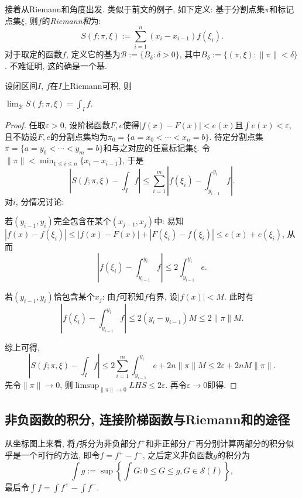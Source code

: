 接着从Riemann和角度出发. 类似于前文的例子, 如下定义: 基于分割点集$\pi$和标记点集$\xi$, 则$f$的\textit{Riemann和}为: $$S(f;\pi ,\xi) := \sum_{i=1}^{n} (x_i-x_{i-1})f(\xi _i) .$$
对于取定的函数$f$, 定义它的基为$\mathcal{B} := \{ B_{\delta}:\delta >0 \}$, 其中$B_{\delta} := \{ (\pi ,\xi) : \| \pi \|< \delta \}$. 不难证明, 这的确是一个基. 

\begin{proposition}{}
	设闭区间$I$, $f$在$I$上Riemann可积, 则
	\begin{center}
		$\displaystyle \lim_{\mathcal{B}} S(f;\pi ,\xi) = \int_I f.$
	\end{center}
\end{proposition}
\begin{proof}
	任取$\varepsilon >0$, 设阶梯函数$F,e$使得$|f(x)-F(x)|<e(x)$且$\int e(x) < \varepsilon$, 且不妨设$F,e$的分割点集均为$\pi _0 =\{ a=x_0<\cdots <x_n=b \}$. 待定分割点集$\pi = \{ a=y_0<\cdots <y_m=b \}$和与之对应的任意标记集$\xi$. 令$\| \pi \| < \min_{1 \leq i \leq n} \{ x_i-x_{i-1} \}$, 于是$$\left| S(f;\pi ,\xi) - \int_I f \right| \leq \sum_{i=1}^{m} \left| f(\xi _i)-\int_{y_{i-1}}^{y_i} f \right|. $$
	对$i$, 分情况讨论: 
	
	若$(y_{i-1},y_i)$完全包含在某个$(x_{j-1},x_j)$中: 易知$|f(x)-f(\xi _i)| \leq |f(x)-F(x)| + |F(\xi _i)-f(\xi _i)| \leq e(x)+e(\xi _i)$, 
	从而$$\left| f(\xi _i)-\int_{y_{i-1}}^{y_i} f \right| \leq 2\int_{y_{i-1}}^{y_i} e.$$
	
	若$(y_{i-1},y_i)$恰包含某个$x_j$: 由$f$可积知$f$有界, 设$|f(x)|<M$. 此时有$$\left| f(\xi _i)-\int_{y_{i-1}}^{y_i} f \right| \leq 2(y_i-y_{i-1})M \leq 2\| \pi \|M.$$
	
	综上可得, $$\left| S(f;\pi ,\xi) - \int_I f \right| \leq 2\sum_{i=1}^{m} \int_{y_{i-1}}^{y_i} e + 2n\| \pi \|M \leq 2\varepsilon + 2nM\| \pi \|.$$
	先令$\| \pi \|\to 0$, 则$\limsup_{\| \pi \|\to 0} LHS \leq 2\varepsilon$. 再令$\varepsilon \to 0$即得. 
\end{proof}


\subsection{非负函数的积分, 连接阶梯函数与Riemann和的途径}

从坐标图上来看, 将$f$拆分为非负部分$f^+$和非正部分$f^-$再分别计算两部分的积分似乎是一个可行的方法, 即令$f=f^+-f^-$, 之后定义非负函数$g$的积分为$$\int g := \sup \left\{ \int G:0\leq G \leq g, G \in \mathcal{S}(I)  \right\}, $$
最后令$\int f = \int f^+ - \int f^-$. 

